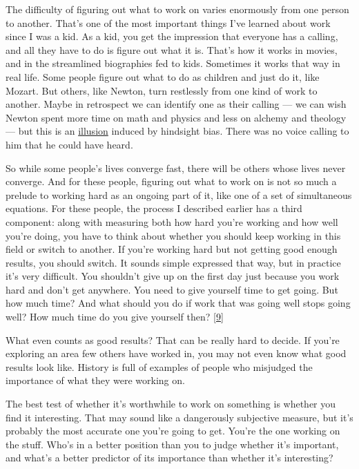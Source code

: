 The difficulty of figuring out what to work on varies enormously from
one person to another. That's one of the most important things I've
learned about work since I was a kid. As a kid, you get the impression
that everyone has a calling, and all they have to do is figure out what
it is. That's how it works in movies, and in the streamlined biographies
fed to kids. Sometimes it works that way in real life. Some people
figure out what to do as children and just do it, like Mozart. But
others, like Newton, turn restlessly from one kind of work to another.
Maybe in retrospect we can identify one as their calling --- we can wish
Newton spent more time on math and physics and less on alchemy and
theology --- but this is an \href{disc.html}{illusion} induced by
hindsight bias. There was no voice calling to him that he could have
heard.

So while some people's lives converge fast, there will be others whose
lives never converge. And for these people, figuring out what to work on
is not so much a prelude to working hard as an ongoing part of it, like
one of a set of simultaneous equations. For these people, the process I
described earlier has a third component: along with measuring both how
hard you're working and how well you're doing, you have to think about
whether you should keep working in this field or switch to another. If
you're working hard but not getting good enough results, you should
switch. It sounds simple expressed that way, but in practice it's very
difficult. You shouldn't give up on the first day just because you work
hard and don't get anywhere. You need to give yourself time to get
going. But how much time? And what should you do if work that was going
well stops going well? How much time do you give yourself then?
{[}\hyperref[f9n]{9}{]}

What even counts as good results? That can be really hard to decide. If
you're exploring an area few others have worked in, you may not even
know what good results look like. History is full of examples of people
who misjudged the importance of what they were working on.

The best test of whether it's worthwhile to work on something is whether
you find it interesting. That may sound like a dangerously subjective
measure, but it's probably the most accurate one you're going to get.
You're the one working on the stuff. Who's in a better position than you
to judge whether it's important, and what's a better predictor of its
importance than whether it's interesting?

